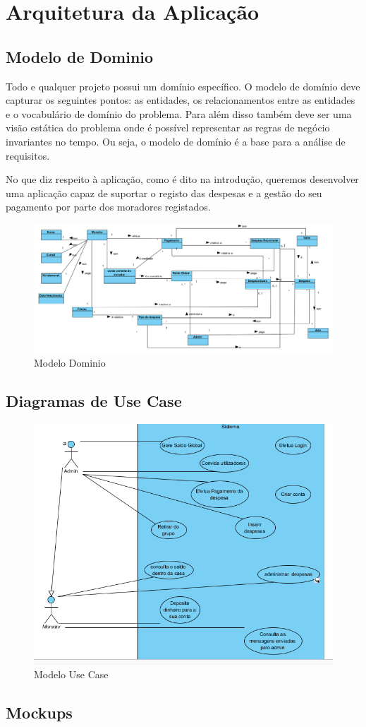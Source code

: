 \chapter{Arquitetura da Aplicação}


\section{Modelo de Dominio }
Todo e qualquer projeto possui um domínio específico. O modelo de domínio deve capturar os seguintes pontos: as entidades, os relacionamentos entre as entidades e o vocabulário de domínio do problema. Para além disso também deve ser uma visão estática do problema onde é possível representar as regras de negócio invariantes no tempo. Ou seja, o modelo de domínio é a base para a análise de requisitos.

No que diz respeito à aplicação, como é dito na introdução, queremos desenvolver uma aplicação capaz de suportar o registo das despesas e a gestão do seu pagamento por parte dos moradores registados.


\begin{figure}[htb!]
	\includegraphics[scale=0.566]{modelodominio}  
	\caption{Modelo Dominio}  
\end{figure}


\section{Diagramas de Use Case}


\begin{figure}[htb!]
	\centering
	\includegraphics[scale=0.7]{usecase1}  
	\caption{Modelo Use Case}  
\end{figure}


\newpage
\section{Mockups}




